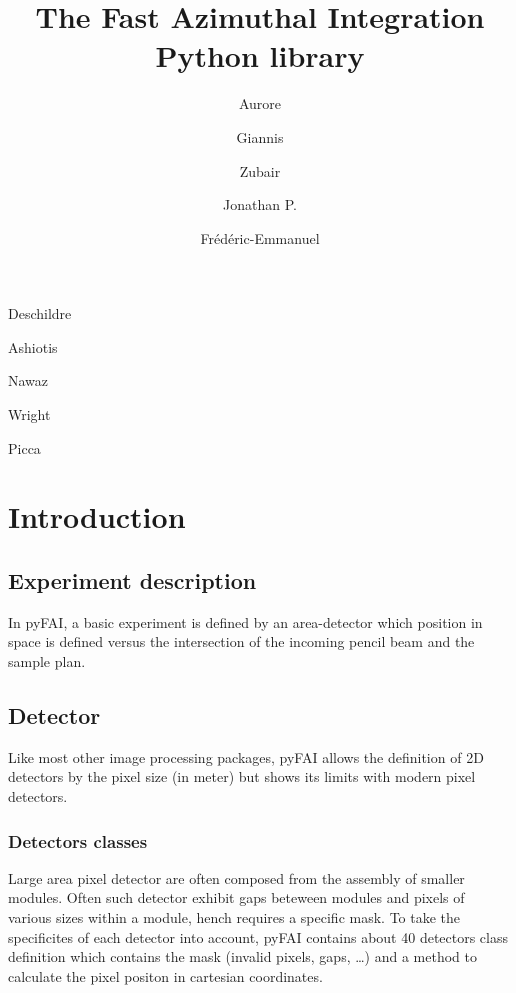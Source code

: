 \documentclass[preprint]{iucr}
\begin{document}
\title{The Fast Azimuthal Integration Python library}

    \author[a]{Aurore}{Deschildre}
    \author[a]{Giannis}{Ashiotis}
    \author[b]{Zubair}{Nawaz}
    \author[a]{Jonathan P.}{Wright}
    \author[c]{Fr\'ed\'eric-Emmanuel}{Picca}

\maketitle

\begin{synopsis}

\end{synopsis}

\begin{abstract}
\end{abstract}

\section{Introduction}

\subsection{Experiment description}
In pyFAI, a basic experiment is defined by an area-detector which position in
space is defined versus the intersection of the incoming pencil beam and the
sample plan. 

\subsection{Detector}
Like most other image processing packages, pyFAI allows the definition of 2D
detectors by the pixel size (in meter) but shows its limits with modern pixel
detectors.

\subsubsection{Detectors classes}
Large area pixel detector are often composed from the assembly of smaller
modules. Often such detector exhibit gaps beteween modules and pixels of various
sizes within a module, hench requires a specific mask.
To take the specificites of each detector into account, pyFAI contains about
40 detectors class definition which contains the mask (invalid pixels, gaps,
\ldots) and a method to calculate the pixel positon in cartesian coordinates. 
\end{document}
